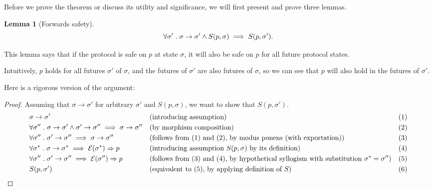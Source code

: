 \documentclass{article}
\theoremstyle{definition}
\newtheorem{lemma}{Lemma}
\begin{document}
Before we prove the theorem or discuss its utility and significance, we will first present and prove three lemmas.

\vspace{5mm}

\begin{lemma}[Forwards safety]
$$
\forall \sigma' \hspace{1mm}.\hspace{1mm} \sigma \to \sigma' \land S(p,\sigma) \implies S(p,\sigma').
$$
\end{lemma}

This lemma says that if the protocol is safe on $p$ at state $\sigma$, it will also be safe on $p$ for all future protocol states.

Intuitively, $p$ holds for all futures $\sigma'$ of $\sigma$, and the futures of $\sigma'$ are also futures of $\sigma$, so we can see that $p$ will also hold in the futures of $\sigma'$. 

Here is a rigorous version of the argument:
\begin{proof}
Assuming that $\sigma \to \sigma'$ for arbitrary $\sigma'$ and $S(p, \sigma)$, we want to show that $S(p, \sigma')$.
  \begin{align*}
    &\sigma \to \sigma' &&\text{(introducing assumption)}   &&\text{(1)}\\ 
    &\forall \sigma'' \hspace{1mm}.\hspace{1mm}\sigma \to \sigma' \land \sigma' \to \sigma'' \implies \sigma \to \sigma'' &&\text{(by morphism composition)}   &&\text{(2)}\\
    &\forall \sigma'' \hspace{1mm}.\hspace{1mm}\sigma' \to \sigma'' \implies \sigma \to \sigma'' &&\text{(follows from (1) and (2), by modus ponens (with exportation))}   &&\text{(3)}\\
    &\forall \sigma^* \hspace{1mm}.\hspace{1mm}\sigma \to \sigma^* \implies \mathcal{E}(\sigma^*) \Rightarrow p &&\text{(introducing assumption $S(p, \sigma)$ by its definition) }   &&\text{(4)} \\
    &\forall \sigma'' \hspace{1mm}.\hspace{1mm}\sigma' \to \sigma'' \implies \mathcal{E}(\sigma'') \Rightarrow p &&\text{(follows from (3) and (4), by hypothetical syllogism with substitution $\sigma^* = \sigma''$)}   &&\text{(5)}\\
    &S(p, \sigma')  \hspace{5mm} \qedhere &&\text{(equivalent to (5), by applying definition of $S$) }   &&\text{(6)}
  \end{align*}
\end{proof}
\end{document}
